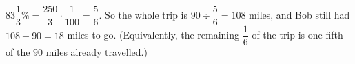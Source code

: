 $83\dfrac{1}{3}\%=\dfrac{250}{3}\cdot\dfrac{1}{100}=\dfrac{5}{6}$. So the whole trip is $90\div\dfrac{5}{6}=108$ miles, and Bob still had $108-90=\boxed{18}$ miles to go. (Equivalently, the remaining $\dfrac{1}{6}$ of the trip is one fifth of the $90$ miles already travelled.)
